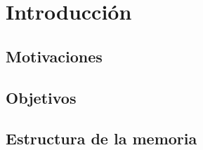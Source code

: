 \chapter{Introducción}



\section{Motivaciones}

\section{Objetivos}

\section{Estructura de la memoria}


\cleardoublepage
	
